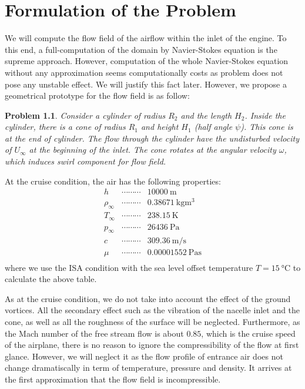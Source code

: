 \documentclass[12pt]{book}
\theoremstyle{bfnote}
\theoremstyle{bfnote}
\newtheorem{problem}{Problem}[chapter]
\begin{document}
\chapter{Formulation of the Problem} %
\label{chap:Formulation_of_the_Problem}

We will compute the flow field of the airflow within the inlet of the engine. To this end, a full-computation of the domain by Navier-Stokes equation is the supreme approach. However, computation of the whole Navier-Stokes equation without any approximation seems computationally costs as problem does not pose any unstable effect. We will justify this fact later. However, we propose a geometrical prototype for the flow field is as follow:

\begin{problem}
    Consider a cylinder of radius $R_2$ and the length $H_2$. Inside the cylinder, there is a cone of radius $R_1$ and height $H_1$ (half angle $\psi$). This cone is at the end of cylinder. The flow through the cylinder have the undisturbed velocity of $U_{\infty}$ at the beginning of the inlet. The cone rotates at the angular velocity $\omega$, which induces swirl component for flow field.
\end{problem}

At the cruise condition, the air has the following properties:
\[
\begin{array}{lcl}
    h & \cdots\cdots\cdots & \SI{10000}{\meter} \\
    \rho_\infty & \cdots\cdots\cdots & \SI{0.38671}{\kilogram\cubic\meter} \\
    T_\infty & \cdots\cdots\cdots & \SI{238.15}{\kelvin} \\
    p_\infty & \cdots\cdots\cdots & \SI{26436}{\pascal} \\
    c & \cdots\cdots\cdots & \SI{309.36}{\meter\per\second} \\
    \mu & \cdots\cdots\cdots & \SI{0.00001552}{\pascal\second} \\
\end{array}
\]
where we use the ISA condition with the sea level offset temperature $T = \SI{15}{\degreeCelsius}$ to calculate the above table.

As at the cruise condition, we do not take into account the effect of the ground vortices. All the secondary effect such as the vibration of the nacelle inlet and the cone, as well as all the roughness of the surface will be neglected. Furthermore, as the Mach number of the free stream flow is about $0.85$, which is the cruise speed of the airplane, there is no reason to ignore the compressibility of the flow at first glance. However, we will neglect it as the flow profile of entrance air does not change dramatiscally in term of temperature, pressure and density. It arrives at the first approximation that the flow field is incompressible.
\end{document}
